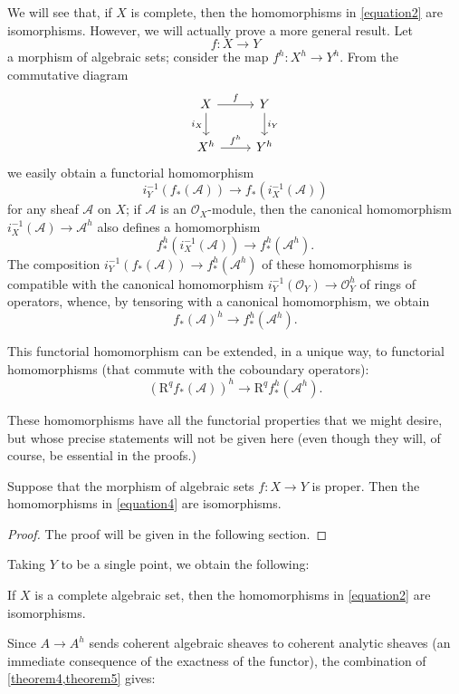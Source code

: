 \documentclass{article}
\theoremstyle{plain}
\newenvironment{theorem}[1]
    {\renewcommand\theinnercustomtheorem{#1}\innercustomtheorem}
    {\endinnercustomtheorem}
\newenvironment{corollary}[1]
    {\renewcommand\theinnercustomcorollary{#1}\innercustomcorollary}
    {\endinnercustomcorollary}
\theoremstyle{definition}
\newcommand{\sh}[1]{{\mathscr{#1}}}
\newcommand{\RR}{\mathrm{R}}
\newcommand{\oldpage}[1]{\marginpar{\footnotesize$\Big\vert$ \textit{p.~#1}}}
\begin{document}
We will see that, if $X$ is complete, then the homomorphisms in \cref{equation2} are isomorphisms.
However, we will actually prove a more general result.
Let
\[
  f\colon X\to Y
\]
\oldpage{2-09}
a morphism of algebraic sets;
consider the map $f^h\colon X^h\to Y^h$.
From the commutative diagram
\[
  \begin{tikzcd}
    X \ar[r,"f"] \ar[d,swap,"i_X"]
    & Y \ar[d,"i_Y"]
  \\X^h \ar[r,"f^h"]
    & Y^h
  \end{tikzcd}
\]
we easily obtain a functorial homomorphism
\[
  i_Y^{-1}(f_*(\sh{A})) \to f_*(i_X^{-1}(\sh{A}))
\]
for any sheaf $\sh{A}$ on $X$;
if $\sh{A}$ is an $\sh{O}_X$-module, then the canonical homomorphism $i_X^{-1}(\sh{A})\to\sh{A}^h$ also defines a homomorphism
\[
  f_*^h(i_X^{-1}(\sh{A})) \to f_*^h(\sh{A}^h).
\]
The composition $i_Y^{-1}(f_*(\sh{A}))\to f_*^h(\sh{A}^h)$ of these homomorphisms is compatible with the canonical homomorphism $i_Y^{-1}(\sh{O}_Y)\to\sh{O}_Y^h$ of rings of operators, whence, by tensoring with a canonical homomorphism, we obtain
\[
\label{equation3}
  f_*(\sh{A})^h \to f_*^h(\sh{A}^h).
  \tag{3}
\]

This functorial homomorphism can be extended, in a unique way, to functorial homomorphisms (that commute with the coboundary operators):
\[
\label{equation4}
  (\RR^qf_*(\sh{A}))^h \to \RR^qf_*^h(\sh{A}^h).
  \tag{4}
\]

These homomorphisms have all the functorial properties that we might desire, but whose precise statements will not be given here (even though they will, of course, be essential in the proofs.)

\begin{theorem}{5}
\label{theorem5}
  Suppose that the morphism of algebraic sets $f\colon X\to Y$ is proper.
  Then the homomorphisms in \cref{equation4} are isomorphisms.
\end{theorem}

\begin{proof}
  The proof will be given in the following section.
\end{proof}

Taking $Y$ to be a single point, we obtain the following:

\begin{corollary}{1}
\label{corollary1-5}
  If $X$ is a complete algebraic set, then the homomorphisms in \cref{equation2} are isomorphisms.
\end{corollary}

Since $A\to A^h$ sends coherent algebraic sheaves to coherent analytic sheaves (an immediate consequence of the exactness of the functor), the combination of \cref{theorem4,theorem5} gives:
\end{document}
